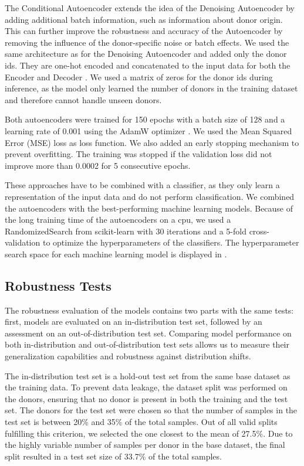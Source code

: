 \documentclass[11pt]{article}
\begin{document}
The Conditional Autoencoder extends the idea of the Denoising Autoencoder by adding additional batch information, such as information about donor origin. This can further improve the robustness and accuracy of the Autoencoder by removing the influence of the donor-specific noise or batch effects. We used the same architecture as for the Denoising Autoencoder and added only the donor ids. They are one-hot encoded and concatenated to the input data for both the Encoder and Decoder \cite{lin_scdilt_2025, hayashi_conformer-based_2020}.
We used a matrix of zeros for the donor ids during inference, as the model only learned the number of donors in the training dataset and therefore cannot handle unseen donors.


Both autoencoders were trained for 150 epochs with a batch size of 128 and a learning rate of 0.001 using the AdamW optimizer \cite{loshchilov2018decoupled}. We used the Mean Squared Error (MSE) loss as loss function. We also added an early stopping mechanism to prevent overfitting. The training was stopped if the validation loss did not improve more than 0.0002 for 5 consecutive epochs.

These approaches have to be combined with a classifier, as they only learn a representation of the input data and do not perform classification. We combined the autoencoders with the best-performing machine learning models.
Because of the long training time of the autoencoders on a cpu, we used a RandomizedSearch from scikit-learn \cite{sklearn} with 30 iterations and a 5-fold cross-validation to optimize the hyperparameters of the classifiers. The hyperparameter search space for each machine learning model is displayed in .


\subsection{Robustness Tests}\label{sec:methods:robustness-tests}

The robustness evaluation of the models contains two parts with the same tests: first, models are evaluated on an in-distribution test set, followed by an assessment on an out-of-distribution test set. Comparing model performance on both in-distribution and out-of-distribution test sets allows us to measure their generalization capabilities and robustness against distribution shifts.

The in-distribution test set is a hold-out test set from the same base dataset as the training data. To prevent data leakage, the dataset split was performed on the donors, ensuring that no donor is present in both the training and the test set. The donors for the test set were chosen so that the number of samples in the test set is between 20\% and 35\% of the total samples. Out of all valid splits fulfilling this criterion, we selected the one closest to the mean of 27.5\%. Due to the highly variable number of samples per donor in the base dataset, the final split resulted in a test set size of 33.7\% of the total samples.
\end{document}
